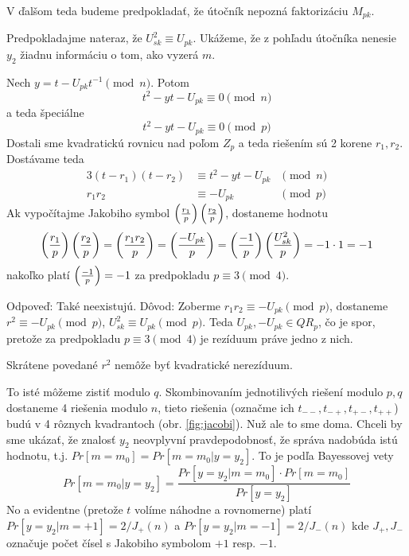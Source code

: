 V ďalšom teda budeme predpokladať, že útočník nepozná faktorizáciu $M_{pk}$.

Predpokladajme nateraz, že $U_{sk}^2 \equiv U_{pk}$.
Ukážeme, že z pohľadu útočníka nenesie $y_2$ žiadnu informáciu o tom, ako
vyzerá $m$.

Nech $y = t - U_{pk} t^{-1} \pmod{n}$.
Potom
\begin{equation*}
    t^2 - y t - U_{pk} \equiv 0 \pmod{n}
\end{equation*}
a teda špeciálne
\begin{equation*}
    t^2 - y t - U_{pk} \equiv 0 \pmod{p}
\end{equation*}
Dostali sme kvadratickú rovnicu nad poľom $Z_p$ a teda riešením sú 2 korene
$r_1,r_2$.
Dostávame teda
\begin{alignat*}{3}
    (t-r_1)(t-r_2) &\equiv t^2 - y t - U_{pk} &\pmod{n}\\
    r_1 r_2 &\equiv -U_{pk} &\pmod{p}
\end{alignat*}
%
Ak vypočítajme Jakobiho symbol $\left( \frac{r_1}{p} \right) \left( \frac{r_2}{p} \right)$,
dostaneme hodnotu 
\begin{equation*}
    \left( \frac{r_1}{p} \right)\left( \frac{r_2}{p} \right) = \left( \frac{r_1 r_2}{p} \right) =
    \left( \frac{-U_{pk}}{p} \right) = \left( \frac{-1}{p} \right) \left( \frac{U_{sk}^2}{p} \right)=-1\cdot 1=-1
\end{equation*}
nakoľko platí $\left( \frac{-1}{p} \right)=-1$ za predpokladu $p \equiv 3 \pmod{4}$.

\begin{poznamka}
    Odpoveď: Také neexistujú. Dôvod:
    Zoberme $r_1 r_2 \equiv -U_{pk} \pmod{p}$, dostaneme $r^2 \equiv
    -U_{pk} \pmod{p}$, $U_{sk}^2 \equiv U_{pk} \pmod{p}$. Teda
    $U_{pk}, -U_{pk} \in QR_p$, čo je spor, pretože za predpokladu 
    $p\equiv 3 \pmod{4}$ je rezíduum práve jedno z nich.

    Skrátene povedané $r^2$ nemôže byť kvadratické nerezíduum.
\end{poznamka}

To isté môžeme zistiť modulo $q$.
Skombinovaním jednotilivých riešení modulo $p,q$ dostaneme 4 riešenia
modulo $n$, tieto riešenia (označme ich $t_{--}, t_{-+}, t_{+-},
t_{++}$) budú v 4 rôznych kvadrantoch 
(obr. \ref{fig:jacobi}). Nuž ale to sme doma.
Chceli by sme ukázať, že znalosť $y_2$ neovplyvní pravdepodobnosť, že
správa nadobúda istú hodnotu, t.j.
$Pr[m=m_0]=Pr[m=m_0 | y=y_2]$.
To je podľa Bayessovej vety
\begin{equation*}
    Pr[m=m_0 | y=y_2] = \frac{Pr[y=y_2 | m=m_0] \cdot Pr[m=m_0]}{Pr[y=y_2]}
\end{equation*}
No a evidentne (pretože $t$ volíme náhodne a rovnomerne)
platí $Pr[y=y_2 | m=+1] =2/J_{+}(n)$ a $Pr[y=y_2 | m=-1] = 2/J_{-}(n)$
kde $J_{+},J_{-}$ označuje počet čísel s Jakobiho symbolom $+1$ resp. $-1$. 

